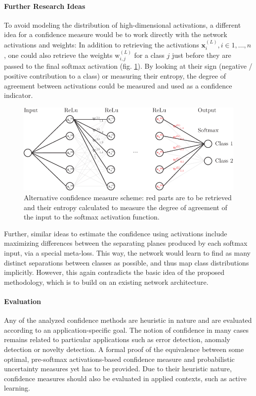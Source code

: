 \documentclass[10pt]{article}
\begin{document}
\paragraph{Further Research Ideas} To avoid modeling the distribution of high-dimensional activations, a different idea for a confidence measure would be to work directly with the network activations and weights: In addition to retrieving the activations $\mathbf{x}^{(L)}_i, i \in 1, ..., n$, one could also retrieve the weights $\text{w}^{(L)}_{i, j}$ for a class $j$ just before they are passed to the final softmax activation (fig. \ref{fig:nn_scheme}). By looking at their sign (negative / positive contribution to a class) or measuring their entropy, the degree of agreement between activations could be measured and used as a confidence indicator.
\begin{figure}[H]
	\centering
	\includegraphics[width=.7\textwidth]{Schema/nn_scheme}
	\caption{Alternative confidence measure scheme: red parts are to be retrieved and their entropy calculated to measure the degree of agreement of the input to the softmax activation function.}
	\label{fig:nn_scheme}
\end{figure}

Further, similar ideas to estimate the confidence using activations include maximizing differences between the separating planes produced by each softmax input, via a special meta-loss. This way, the network would learn to find as many distinct separations between classes as possible, and thus map class distributions implicitly. However, this again contradicts the basic idea of the proposed methodology, which is to build on an existing network architecture.

\paragraph{Evaluation} Any of the analyzed confidence methods are heuristic in nature and are evaluated according to an application-specific goal. The notion of confidence in many cases remains related to particular applications such as error detection, anomaly detection or novelty detection. A formal proof of the equivalence between some optimal, pre-softmax activations-based confidence measure and probabilistic uncertainty measures yet has to be provided. Due to their heuristic nature, confidence measures should also be evaluated in applied contexts, such as active learning.
\end{document}
